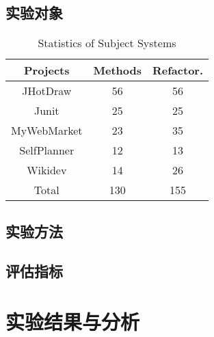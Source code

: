 \subsection{实验对象}
\begin{table}[!t]
  \renewcommand{\arraystretch}{1.3}
  \caption{Statistics of Subject Systems}
  \label{benchmark}
  \centering
  \begin{tabular}{ccc}
  \toprule 
  Projects &Methods &Refactor.\\ \midrule
  JHotDraw &56 &56 \\ 
  Junit &25 &25 \\ 
  MyWebMarket &23 &35 \\ 
  SelfPlanner &12 &13 \\ 
  Wikidev &14 &26 \\ \midrule
  Total &130 &155 \\ 
  \bottomrule
  \end{tabular}
  \end{table}

\subsection{实验方法}

\subsection{评估指标}

\section{实验结果与分析}

